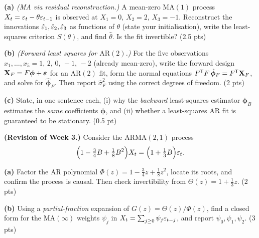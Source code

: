 \documentclass[11pt]{article}
\begin{document}
\textbf{(a)} \emph{(MA via residual reconstruction.)} A mean-zero $\mathrm{MA}(1)$ process $X_t=\varepsilon_t-\theta\varepsilon_{t-1}$ is observed at $X_1=0$, $X_2=2$, $X_3=-1$. Reconstruct the innovations $\hat{\varepsilon}_1,\hat{\varepsilon}_2,\hat{\varepsilon}_3$ as functions of $\theta$ (state your initialisation), write the least-squares criterion $S(\theta)$, and find $\hat\theta$. Is the fit invertible? \hfill(2.5 pts)

\textbf{(b)} \emph{(Forward least squares for $\mathrm{AR}(2)$.)} For the five observations $x_1,\dots,x_5=1,\,2,\,0,\,-1,\,-2$ (already mean-zero), write the forward design $\mathbf X_F=F\boldsymbol\phi+\boldsymbol{\varepsilon}$ for an $\mathrm{AR}(2)$ fit, form the normal equations $F^{\mathsf{T}} F\,\hat{\boldsymbol\phi}_F=F^{\mathsf{T}}\mathbf X_F$, and solve for $\hat{\boldsymbol\phi}_F$. Then report $\hat\sigma_F^2$ using the correct degrees of freedom. \hfill(2 pts)

\textbf{(c)} State, in one sentence each, (i) why the \emph{backward} least-squares estimator $\hat{\boldsymbol\phi}_B$ estimates the \emph{same} coefficients $\boldsymbol\phi$, and (ii) whether a least-squares AR fit is guaranteed to be stationary. \hfill(0.5 pt)
\answerpage

\textbf{(Revision of Week 3.)} Consider the $\mathrm{ARMA}(2,1)$ process
\[
\Big(1-\tfrac34B+\tfrac18B^2\Big)X_t=\Big(1+\tfrac13B\Big)\varepsilon_t .
\]

\textbf{(a)} Factor the AR polynomial $\Phi(z)=1-\tfrac34 z+\tfrac18 z^2$, locate its roots, and confirm the process is causal. Then check invertibility from $\Theta(z)=1+\tfrac13 z$. \hfill(2 pts)

\textbf{(b)} Using a \emph{partial-fraction} expansion of $G(z)=\Theta(z)/\Phi(z)$, find a closed form for the $\mathrm{MA}(\infty)$ weights $\psi_j$ in $X_t=\sum_{j\ge0}\psi_j\varepsilon_{t-j}$, and report $\psi_0,\psi_1,\psi_2$. \hfill(3 pts)
\answerpage
\end{document}
